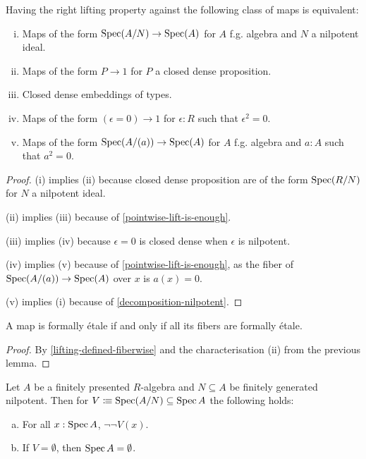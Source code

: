 \begin{lemma}
\label{equivalence-etale}
Having the right lifting property against the following class of maps is equivalent:
\begin{enumerate}[(i)]
\item Maps of the form $\operatorname{Spec}(A/N)\to \operatorname{Spec}(A)$ for $A$ f.g. algebra and $N$ a nilpotent ideal.
\item Maps of the form $P\to 1$ for $P$ a closed dense proposition.
\item Closed dense embeddings of types.
\item Maps of the form $(\epsilon=0)\to 1$ for $\epsilon:R$ such that $\epsilon^2=0$.
\item Maps of the form $\operatorname{Spec}(A/(a)) \to \operatorname{Spec}(A)$ for $A$ f.g. algebra and $a:A$ such that $a^2=0$.
\end{enumerate}
\end{lemma}

\begin{proof}
(i) implies (ii) because closed dense proposition are of the form $\operatorname{Spec}(R/N)$ for $N$ a nilpotent ideal.

(ii) implies (iii) because of \cref{pointwise-lift-is-enough}.

(iii) implies (iv) because $\epsilon=0$ is closed dense when $\epsilon$ is nilpotent.

(iv) implies (v) because of \cref{pointwise-lift-is-enough}, as the fiber of $\operatorname{Spec}(A/(a)) \to \operatorname{Spec}(A)$ over $x$ is $a(x)=0$.

(v) implies (i) because of \cref{decomposition-nilpotent}.
\end{proof}

\begin{lemma}
A map is formally étale if and only if all its fibers are formally étale.
\end{lemma}

\begin{proof}
By \cref{lifting-defined-fiberwise} and the characterisation (ii) from the previous lemma.
\end{proof}

\begin{lemma}%
  \label{nilpotent-ideal-not-not-dense}
  Let $A$ be a finitely presented $R$-algebra and $N\subseteq A$ be finitely generated nilpotent.
  Then for $V\vcentcolon\mspace{-1.2mu}\equiv \operatorname{Spec} (A/N)\subseteq \operatorname{Spec} A$ the following holds:
  \begin{enumerate}[(a)]
  \item For all $x:\operatorname{Spec} A$, $\neg\neg V(x)$.
  \item If $V=\emptyset$, then $\operatorname{Spec} A=\emptyset$.
  \end{enumerate}
\end{lemma}

